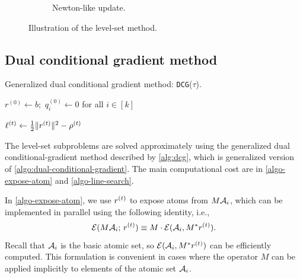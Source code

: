 \begin{figure}[t]
\begin{subfigure}{.48\textwidth}
      \captionsetup{justification=centering}
      \caption{Newton-like update.}
    \end{subfigure}
    \captionsetup{justification=centering}
    \caption{Illustration of the level-set method.}
    \label{fig:value_fn}
\end{figure}

\subsection{Dual conditional gradient method} \label{sec:dcg}

\begin{algorithm}[t]
  \DontPrintSemicolon
  \setcounter{AlgoLine}{0}
  \caption{Generalized dual conditional gradient method: \texttt{DCG}($\tau$). \label{alg:dcg}}
  \KwIn{$\tau$}

  $r^{(0)} \gets b$;\ $q_i^{(0)} \gets 0$ for all $i\in[k]$\;

  $\ell^{(t)}\gets{\textstyle{\frac{1}{2}}}\|r^{(t)}\|^2-\rho^{(t)}$

\end{algorithm}

The level-set subproblems are solved approximately using the generalized dual conditional-gradient method described by \autoref{alg:dcg}, which is generalized version of \autoref{algo:dual-conditional-gradient}. The main computational cost are in \autoref{algo-expose-atom} and \autoref{algo-line-search}. 

In \autoref{algo-expose-atom}, we use $r^{(t)}$ to expose atoms from $M\mathcal{A}_i$, which can be implemented in parallel using the following identity, i.e.,
\begin{equation*}
  \mathcal{E}(M\mathcal{A}_i;\,r^{(t)}) \equiv M\cdot\mathcal{E}(\mathcal{A}_i, M^*r^{(t)}).
\end{equation*}
Recall that $\mathcal{A}_i$ is the basic atomic set, so $\mathcal{E}(\mathcal{A}_i, M^*r^{(t)})$ can be efficiently computed. This formulation is convenient in cases where the operator $M$ can be applied implicitly to elements of the atomic set $\mathcal{A}_i$. 

